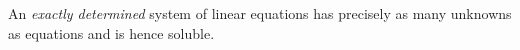 \documentclass[12pt]{article}
\begin{document}
An \emph{exactly determined} system of linear equations has precisely as many unknowns as equations and is hence soluble.
\end{document}
